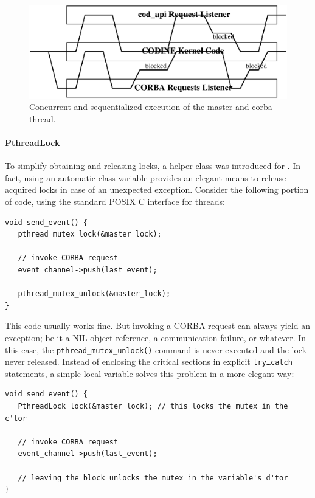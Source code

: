 \begin{figure}
\includegraphics[width=\textwidth]{serverflow.eps}
\caption{\label{f_prog_locking}Concurrent and sequentialized execution of the
master and corba thread.}
\end{figure}

\paragraph{PthreadLock}
To simplify obtaining and releasing locks, a helper class was introduced for
\qidl. In fact, using an automatic class variable provides an elegant means to
release acquired locks in case of an unexpected exception. Consider the
following portion of code, using the standard POSIX C interface for threads:

\begin{Verbatim}[fontsize=\small, frame=single]
void send_event() {
   pthread_mutex_lock(&master_lock);
   
   // invoke CORBA request
   event_channel->push(last_event);
   
   pthread_mutex_unlock(&master_lock);
}
\end{Verbatim}

This code usually works fine. But invoking a CORBA request can always yield
an exception; be it a NIL object reference, a communication failure, or
whatever. In
this case, the \texttt{pthread\_mutex\_unlock()} command is never executed
and the lock never released. Instead of enclosing the critical sections in
explicit \texttt{try\dots catch} statements, a simple local variable solves
this problem in a more elegant way:

\begin{Verbatim}[fontsize=\small, frame=single]
void send_event() {
   PthreadLock lock(&master_lock); // this locks the mutex in the c'tor
   
   // invoke CORBA request
   event_channel->push(last_event);

   // leaving the block unlocks the mutex in the variable's d'tor
}
\end{Verbatim}

